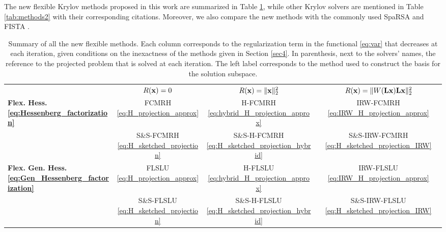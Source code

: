 \documentclass[11pt]{article}
\numberwithin{equation}{section}
\newcommand{\bfL}{{\bf L}}
\newcommand{\bfx}{{\bf x}}
\begin{document}
The new flexible Krylov methods proposed in this work are summarized in Table \ref{tab:methods}, while other Krylov solvers are mentioned in Table \ref{tab:methods2} with their corresponding citations. Moreover, we also compare the new methods with the commonly used SpaRSA \cite{Wright2008sparsa} and FISTA \cite{beck2009fista}.

\begingroup
\renewcommand{\arraystretch}{1} %
\setlength{\tabcolsep}{4pt} %
\small
\begin{table}[h]
\caption{Summary of all the new flexible methods. Each column corresponds to the regularization term in the functional \eqref{eq:var} that decreases at each iteration, given conditions on the inexactness of the methods given in Section \ref{sec4}. In parenthesis, next to the solvers' names, the reference to the projected problem that is solved at each iteration. The left label corresponds to the method used to construct the basis for the solution subspace.}
\label{tab:methods}
\begin{tabular}{cccc}
& \bf $R(\bfx) =0$ & \bf $R(\bfx)=\|\bfx\|_2^2$  &  $R(\bfx)=\|W(\bfL\bfx)\bfL\bfx\|_2^2$   \\ \cline{2-4} 
\multicolumn{1}{l|}{\multirow{2}{*}{\bf{Flex. Hess.} \eqref{eq:Hessenberg_factorization}}} & FCMRH \eqref{eq:H_projection_approx}  & H-FCMRH \eqref{eq:hybrid_H_projection_approx}& IRW-FCMRH \eqref{eq:IRW_H_projection_approx} \\
\multicolumn{1}{l|}{ } &  S\&S-FCMRH \eqref{eq:H_sketched_projection} & S\&S-H-FCMRH \eqref{eq:H_sketched_projection_hybrid} &  S\&S-IRW-FCMRH \eqref{eq:H_sketched_projection_IRW} \\
\multicolumn{1}{l|}{\multirow{2}{*}{\bf{Flex. Gen. Hess.} \eqref{eq:Gen_Hessenberg_factorization}}} & FLSLU \eqref{eq:H_projection_approx} & H-FLSLU \eqref{eq:hybrid_H_projection_approx}& IRW-FLSLU  \eqref{eq:IRW_H_projection_approx} \\
\multicolumn{1}{l|}{ } &  S\&S-FLSLU  \eqref{eq:H_sketched_projection} & S\&S-H-FLSLU \eqref{eq:H_sketched_projection_hybrid} &  S\&S-IRW-FLSLU \eqref{eq:H_sketched_projection_IRW}
\end{tabular}
\end{table}
\normalsize
\endgroup
\end{document}
